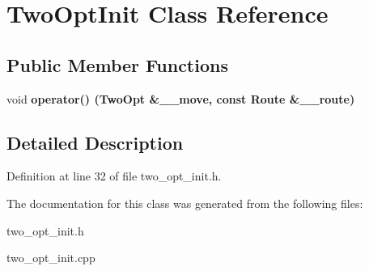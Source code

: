 \section{Two\-Opt\-Init Class Reference}
\label{class_two_opt_init}
\subsection*{Public Member Functions}
\begin{CompactItemize}
\item 
void \bf{operator()} (\bf{Two\-Opt} \&\_\-\_\-move, const Route \&\_\-\_\-route)\label{class_two_opt_init_5bf6af064d37ebd955ffb5a623e78e1b}

\end{CompactItemize}


\subsection{Detailed Description}




Definition at line 32 of file two\_\-opt\_\-init.h.

The documentation for this class was generated from the following files:\begin{CompactItemize}
\item 
two\_\-opt\_\-init.h\item 
two\_\-opt\_\-init.cpp\end{CompactItemize}

